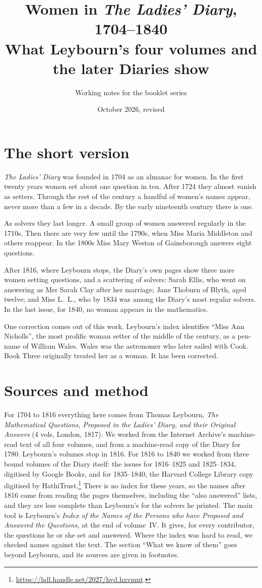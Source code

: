 \documentclass[11pt,a4paper]{article}
\title{Women in \textit{The Ladies' Diary}, 1704--1840\\[2pt]
\large What Leybourn's four volumes and the later Diaries show}
\author{Working notes for the booklet series}
\date{October 2026, revised}
\begin{document}
\maketitle

\section*{The short version}

\textit{The Ladies' Diary} was founded in 1704 as an almanac for women. In the first
twenty years women set about one question in ten. After 1724 they almost vanish as
setters. Through the rest of the century a handful of women's names appear, never more
than a few in a decade. By the early nineteenth century there is one.

As solvers they last longer. A small group of women answered regularly in the 1710s.
Then there are very few until the 1790s, when Miss Maria Middleton and others reappear.
In the 1800s Miss Mary Weston of Gainsborough answers eight questions.

After 1816, where Leybourn stops, the Diary's own pages show three more women setting
questions, and a scattering of solvers: Sarah Ellis, who went on answering as Mrs Sarah
Clay after her marriage; Jane Thoburn of Blyth, aged twelve; and Miss L.~L., who by 1834
was among the Diary's most regular solvers. In the last issue, for 1840,
no woman appears in the mathematics.

One correction comes out of this work. Leybourn's index identifies ``Miss Ann
Nicholls'', the most prolific woman setter of the middle of the century, as a pen-name
of William Wales. Wales was the astronomer who later sailed with Cook. Book Three originally
treated her as a woman. It has been corrected.

\section*{Sources and method}

For 1704 to 1816 everything here comes from Thomas Leybourn, \textit{The Mathematical
Questions, Proposed in the Ladies' Diary, and their Original Answers} (4 vols, London,
1817). We worked from the Internet Archive's machine-read text of all four volumes, and
from a machine-read copy of the Diary for 1780. Leybourn's volumes stop in 1816. For 1816
to 1840 we worked from three bound volumes of the Diary itself: the issues for 1816--1825
and 1825--1834, digitised by Google Books, and for 1835--1840, the Harvard College Library
copy digitised by HathiTrust.\footnote{\url{https://hdl.handle.net/2027/hvd.hxvmnt}.}
There is no index for these years, so the names after 1816 come from reading the pages
themselves, including the ``also answered'' lists, and they are less complete than
Leybourn's for the solvers he printed. The main tool is Leybourn's \emph{Index of the
Names of the Persons who have Proposed and Answered the Questions}, at the end of
volume~IV. It gives, for every contributor, the questions he or she set and answered.
Where the index was hard to read, we checked names against the text. The section
``What we know of them'' goes beyond Leybourn, and its sources are given in footnotes.
\end{document}
